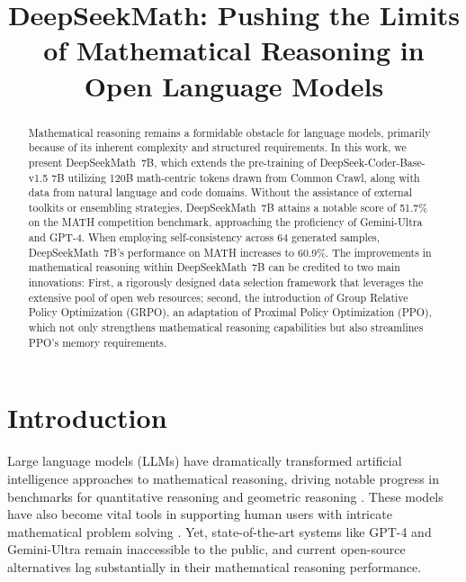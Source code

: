 \title{DeepSeekMath: Pushing the Limits of Mathematical Reasoning in Open Language Models}

\begin{abstract}
Mathematical reasoning remains a formidable obstacle for language models, primarily because of its inherent complexity and structured requirements. In this work, we present DeepSeekMath~7B, which extends the pre-training of DeepSeek-Coder-Base-v1.5 7B utilizing 120B math-centric tokens drawn from Common Crawl, along with data from natural language and code domains. Without the assistance of external toolkits or ensembling strategies, DeepSeekMath~7B attains a notable score of 51.7\% on the MATH competition benchmark, approaching the proficiency of Gemini-Ultra and GPT-4. When employing self-consistency across 64 generated samples, DeepSeekMath~7B's performance on MATH increases to 60.9\%. The improvements in mathematical reasoning within DeepSeekMath~7B can be credited to two main innovations: First, a rigorously designed data selection framework that leverages the extensive pool of open web resources; second, the introduction of Group Relative Policy Optimization (GRPO), an adaptation of Proximal Policy Optimization (PPO), which not only strengthens mathematical reasoning capabilities but also streamlines PPO's memory requirements.
\end{abstract}

\section{Introduction}

Large language models (LLMs) have dramatically transformed artificial intelligence approaches to mathematical reasoning, driving notable progress in benchmarks for quantitative reasoning \citep{MATH} and geometric reasoning \citep{trinh2024solving}. These models have also become vital tools in supporting human users with intricate mathematical problem solving \citep{tao}. Yet, state-of-the-art systems like GPT-4 \citep{gpt4} and Gemini-Ultra \citep{gemini} remain inaccessible to the public, and current open-source alternatives lag substantially in their mathematical reasoning performance.


